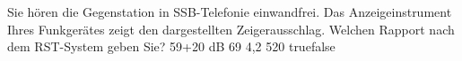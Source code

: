     {Sie hören die Gegenstation in SSB-Telefonie einwandfrei. Das Anzeigeinstrument Ihres Funkgerätes zeigt den dargestellten Zeigerausschlag. Welchen Rapport nach dem RST-System geben Sie?}
    {59+20 dB}
    {69}
    {4,2}
    {520}
    {true}{false}